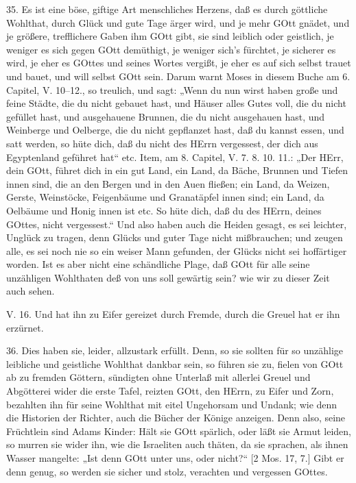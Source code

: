 35. Es ist eine böse, giftige Art menschliches Herzens, daß es durch göttliche Wohlthat, durch Glück und gute Tage ärger wird, und je mehr GOtt gnädet, und je größere, trefflichere Gaben ihm GOtt gibt, sie sind leiblich oder geistlich, je weniger es sich gegen GOtt demüthigt, je weniger sich’s fürchtet, je sicherer es wird, je eher es GOttes und seines Wortes vergißt, je eher es auf sich selbst trauet und bauet, und will selbst GOtt sein. Darum warnt Moses in diesem Buche am 6. Capitel, V. 10–12., so treulich, und sagt: „Wenn du nun wirst haben große und feine Städte, die du nicht gebauet hast, und Häuser alles Gutes voll, die du nicht gefüllet hast, und ausgehauene Brunnen, die du nicht ausgehauen hast, und Weinberge und Oelberge, die du nicht gepflanzet hast, daß du kannst essen, und satt werden, so hüte dich, daß du nicht des HErrn vergessest, der dich aus Egyptenland geführet hat“ etc. Item, am 8. Capitel, V. 7. 8. 10. 11.: „Der HErr, dein GOtt, führet dich in ein gut Land, ein Land, da Bäche, Brunnen und Tiefen innen sind, die an den Bergen und in den Auen fließen; ein Land, da Weizen, Gerste, Weinstöcke, Feigenbäume und Granatäpfel innen sind; ein Land, da Oelbäume und Honig innen ist etc. So hüte dich, daß du des HErrn, deines GOttes, nicht vergessest.“ Und also haben auch die Heiden gesagt, es sei leichter, Unglück zu tragen, denn Glücks und guter Tage nicht mißbrauchen; und zeugen alle, es sei noch nie so ein weiser Mann gefunden, der Glücks nicht sei hoffärtiger worden. Ist es aber nicht eine schändliche Plage, daß GOtt für alle seine unzähligen Wohlthaten deß von uns soll gewärtig sein? wie wir zu dieser Zeit auch sehen.

\begin{schriftzitat}
V. 16. Und hat ihn zu Eifer gereizet durch Fremde, durch die Greuel hat er ihn erzürnet.
\end{schriftzitat}

36. Dies haben sie, leider, allzustark erfüllt. Denn, so sie sollten für so unzählige leibliche und geistliche Wohlthat dankbar sein, so führen sie zu, fielen von GOtt ab zu fremden Göttern, sündigten ohne Unterlaß mit allerlei Greuel und Abgötterei wider die erste Tafel, reizten GOtt, den HErrn, zu Eifer und Zorn, bezahlten ihn für seine Wohlthat mit eitel Ungehorsam und Undank; wie denn die Historien der Richter, auch die Bücher der Könige anzeigen. Denn also, seine Früchtlein sind Adams Kinder: Hält sie GOtt spärlich, oder läßt sie Armut leiden, so murren sie wider ihn, wie die Israeliten auch thäten, da sie sprachen, als ihnen Wasser mangelte: „Ist denn GOtt unter uns, oder nicht?“ [2 Mos. 17, 7.] Gibt er denn genug, so werden sie sicher und stolz, verachten und vergessen GOttes.

